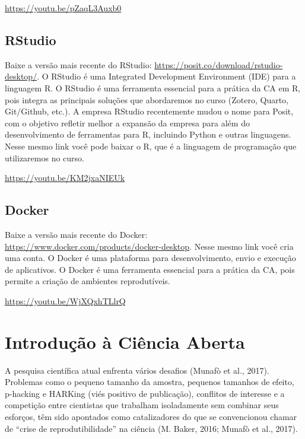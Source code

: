 \documentclass[
  a4paper,
]{book}
\begin{document}
\url{https://youtu.be/pZaqL3Auxb0}

\section*{RStudio}\label{sec-rstudioprework}


Baixe a versão mais recente do RStudio:
\url{https://posit.co/download/rstudio-desktop/}. O RStudio é uma
Integrated Development Environment (IDE) para a linguagem R. O RStudio é
uma ferramenta essencial para a prática da CA em R, pois integra as
principais soluções que abordaremos no curso (Zotero, Quarto,
Git/Github, etc.). A empresa RStudio recentemente mudou o nome para
Posit, com o objetivo refletir melhor a expansão da empresa para além do
desenvolvimento de ferramentas para R, incluindo Python e outras
linguagens. Nesse mesmo link você pode baixar o R, que é a linguagem de
programação que utilizaremos no curso.

\url{https://youtu.be/KM2jxaNIEUk}

\section*{Docker}\label{sec-dockerprework}


Baixe a versão mais recente do Docker:
\url{https://www.docker.com/products/docker-desktop}. Nesse mesmo link
você cria uma conta. O Docker é uma plataforma para desenvolvimento,
envio e execução de aplicativos. O Docker é uma ferramenta essencial
para a prática da CA, pois permite a criação de ambientes reprodutíveis.

\url{https://youtu.be/WjXQxhTLlrQ}


\chapter{Introdução à Ciência Aberta}\label{sec-intro}

A pesquisa científica atual enfrenta vários desafios (Munafò et al.,
2017). Problemas como o pequeno tamanho da amostra, pequenos tamanhos de
efeito, p-hacking e HARKing (viés positivo de publicação), conflitos de
interesse e a competição entre cientistas que trabalham isoladamente sem
combinar seus esforços, têm sido apontados como catalizadores do que se
convencionou chamar de ``crise de reprodutibilidade'' na ciência (M.
Baker, 2016; Munafò et al., 2017).
\end{document}
